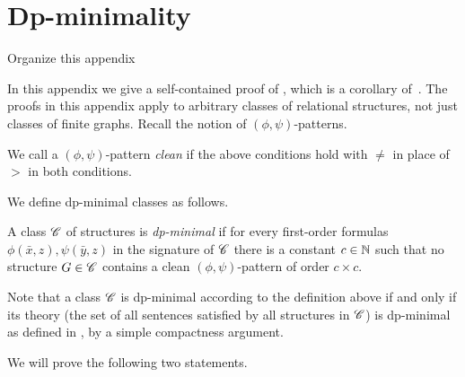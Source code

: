
\section{Dp-minimality}\label{sec:forbidden-patterns}
\label{app:patterns}
\begin{szin}
Organize this appendix
\end{szin}
In this appendix we give a self-contained proof of , which is a corollary of~\cite[Lemma~C.1]{ordered-tww}. The proofs in this appendix apply to arbitrary classes of relational structures, not just classes of finite graphs.
Recall the notion of $(\phi,\psi)$-patterns.

\noindent We call a $(\phi,\psi)$-pattern \emph{clean} if the above conditions hold with $\neq$ in place of $>$ in both conditions.

We define dp-minimal classes  \cite{DolichGoodrickLippel2011} as follows.
\begin{definition}
A class $\mathscr C$ of structures is \emph{dp-minimal} 
if for every first-order formulas $\phi(\bar x,z),\psi(\bar y,z)$ in the signature of $\mathscr C$ there is a constant $c\in\mathbb N$ such that no structure $G\in\mathscr C$ contains a clean $(\phi,\psi)$-pattern of order $c\times c$.   
\end{definition}

Note that a class $\mathscr C$ is dp-minimal according to the definition above if and only if 
its theory (the set of all sentences satisfied by all structures in $\mathscr C$) is dp-minimal as defined in
 \cite{DolichGoodrickLippel2011}, by a simple compactness argument.

 \medskip
We will prove the following two statements.
\mondepdpmin*


\lemphipsi*


